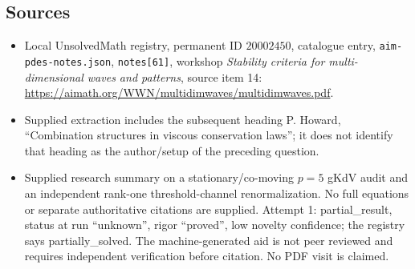 \documentclass[11pt]{article}
\begin{document}
\subsection{Sources}
\begin{itemize}
\item Local UnsolvedMath registry, permanent ID \(20002450\), catalogue entry, \texttt{aim-pdes-notes.json}, \texttt{notes[61]}, workshop \emph{Stability criteria for multi-dimensional waves and patterns}, source item 14: \url{https://aimath.org/WWN/multidimwaves/multidimwaves.pdf}.
\item Supplied extraction includes the subsequent heading P. Howard, ``Combination structures in viscous conservation laws''; it does not identify that heading as the author/setup of the preceding question.
\item Supplied research summary on a stationary/co-moving \(p=5\) gKdV audit and an independent rank-one threshold-channel renormalization. No full equations or separate authoritative citations are supplied. Attempt 1: partial\_result, status at run ``unknown'', rigor ``proved'', low novelty confidence; the registry says partially\_solved. The machine-generated aid is not peer reviewed and requires independent verification before citation. No PDF visit is claimed.
\end{itemize}
\end{document}
